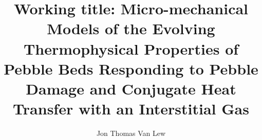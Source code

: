 \documentclass [PhD] {uclathes}
\title          {Working title: Micro-mechanical Models of the Evolving Thermophysical Properties of Pebble Beds Responding to Pebble Damage and Conjugate Heat Transfer with an Interstitial Gas}
\author         {Jon Thomas Van Lew}
\begin{document}
\makeintropages














\end{document}
